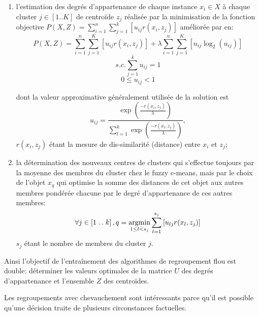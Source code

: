 \begin{enumerate}
 \item l'estimation des degrés d'appartenance de chaque instance $x_i \in X$ à chaque cluster $j \in [1..K]$ de centroïde $z_j$ réalisée par la minimisation de la fonction objective $P(X,Z) = \sum\limits_{i=1}^{n}\sum\limits_{j=1}^{k} \left[u_{ij}r(x_i,z_j)\right]$ \citep{krishnapuram2001fuzzycmedoids}  améliorée par \citet{sabzi2011fuzzykmedoids} en:
 \[P(X,Z) = \sum\limits_{i=1}^{n}\sum\limits_{j=1}^{K} \left[u_{ij}r(x_i,z_j)\right] + \lambda \sum\limits_{i=1}^{n}\sum\limits_{j=1}^{K} \left[ u_{ij}\log_2(u_{ij}) \right] \]
 \[s.c. \sum\limits_{j=1}^{k} u_{ij} = 1\]
 \[0 \leq u_{ij} < 1\]
 
 dont la valeur approximative généralement utilisée de la solution est \[u_{ij} = \frac{\exp\left(\frac{-r(x_i,z_j)}{\lambda}\right)}{\sum_{l=1}^{k}\exp\left(\frac{-r(x_l,z_j)}{\lambda}\right)},\] $r(x_i,z_j)$ étant la mesure de dis-similarité (distance) entre $x_i$ et  $z_j$;
 \item la détermination des nouveaux centres de clusters qui s'effectue toujours par la moyenne des membres du cluster chez le fuzzy c-means, mais par le choix de l'objet $x_q$ qui optimise la somme des distances de cet objet aux autres membres pondérée chacune par le degré d'appartenance de ces autres membres: \[\forall j \in  \left[1\mathrel{{.}\,{.}}\nobreak k \right], q = \mathop{\mathrm{argmin}}\limits\limits_{1 \leq l < s_j} \sum\limits_{l=1}^{s_j} \left[u_{lj}r(x_l,z_j)\right]\] $s_j$ étant le nombre de membres du cluster $j$.
\end{enumerate}
 Ainsi l'objectif de l'entraînement des algorithmes de regroupement flou est double: déterminer les valeurs optimales de la matrice $U$ des degrés d'appartenance et l'ensemble $Z$ des centroïdes. 
 
 Les regroupements avec chevauchement sont intéressants parce qu'il est possible qu'une décision traite de plusieurs circonstances factuelles.

